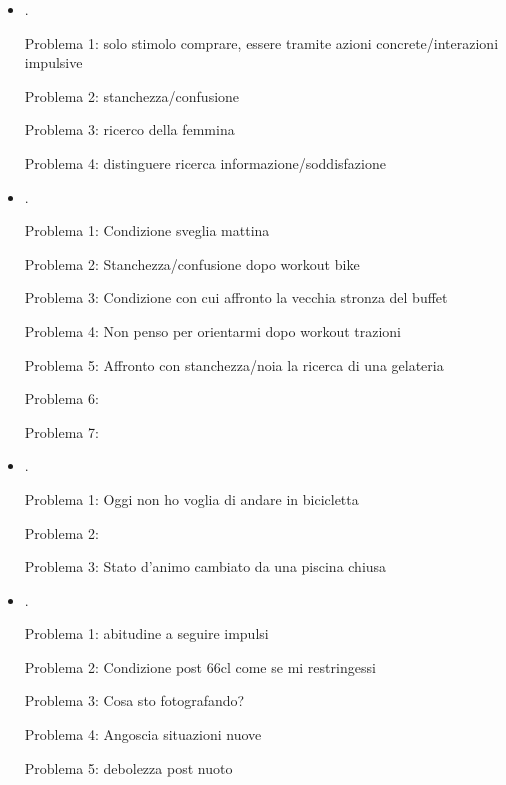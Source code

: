 \begin{itemize}
Problema 3: interazione con parrucchiera determinata da impoulso risposta

Problema 4: Firenze as research of a place to rest

Problema 5: non ci vedo pi\'u dal sonno

\item {}.

Problema 1: solo stimolo comprare, essere tramite azioni concrete/interazioni impulsive

Problema 2: stanchezza/confusione

Problema 3: ricerco della femmina

Problema 4: distinguere ricerca informazione/soddisfazione


\item {}.

Problema 1: Condizione sveglia mattina 

Problema 2: Stanchezza/confusione dopo workout bike

Problema 3: Condizione con cui affronto la vecchia stronza del buffet

Problema 4: Non penso per orientarmi dopo workout trazioni

Problema 5: Affronto con stanchezza/noia la ricerca di una gelateria

Problema 6: 

Problema 7: 

\item {}.

Problema 1: Oggi non ho voglia di andare in bicicletta

Problema 2: 

Problema 3: Stato d'animo cambiato da una piscina chiusa


\item {}.

Problema 1: abitudine a seguire impulsi

Problema 2: Condizione post 66cl come se mi restringessi

Problema 3: Cosa sto fotografando?

Problema 4: Angoscia situazioni nuove

Problema 5: debolezza post nuoto


\end{itemize}
